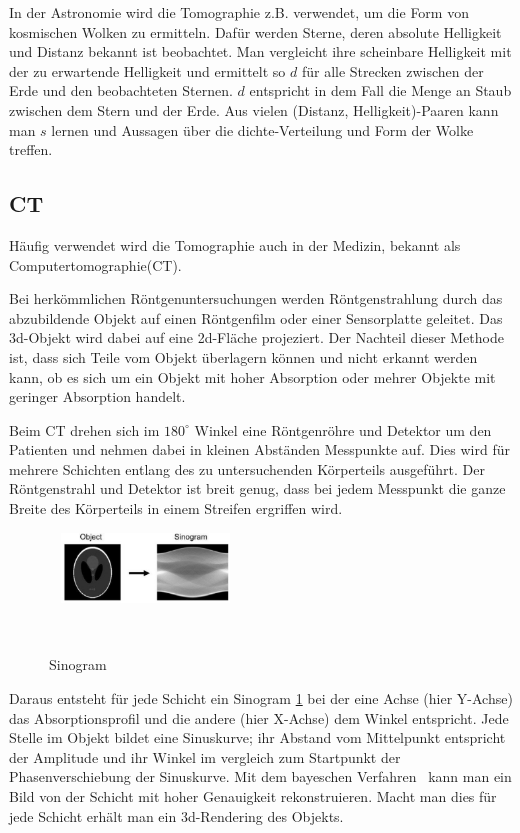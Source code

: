 \documentclass[]{dsadokumentation}
\begin{document}
In der Astronomie wird die Tomographie z.B. verwendet, um die Form von kosmischen Wolken zu ermitteln. Dafür werden Sterne, deren absolute Helligkeit und Distanz bekannt ist beobachtet. Man vergleicht ihre scheinbare Helligkeit mit der zu erwartende Helligkeit und ermittelt so $d$ für alle Strecken zwischen der Erde und den beobachteten Sternen. $d$ entspricht in dem Fall die Menge an Staub zwischen dem Stern und der Erde. Aus vielen (Distanz, Helligkeit)-Paaren kann man $s$ lernen und Aussagen über die dichte-Verteilung und Form der Wolke treffen.

\subsection{CT}

Häufig verwendet wird die Tomographie auch in der Medizin, bekannt als Computertomographie(CT).

Bei herkömmlichen Röntgenuntersuchungen werden Röntgenstrahlung durch das abzubildende Objekt auf einen Röntgenfilm oder einer Sensorplatte geleitet. Das 3d-Objekt wird dabei auf eine 2d-Fläche projeziert. Der Nachteil dieser Methode ist, dass sich Teile vom Objekt überlagern können und nicht erkannt werden kann, ob es sich um ein Objekt mit hoher Absorption oder mehrer Objekte mit geringer Absorption handelt.

Beim CT drehen sich im $180^\circ$ Winkel eine Röntgenröhre und Detektor um den Patienten und nehmen dabei in kleinen Abständen Messpunkte auf. Dies wird für mehrere Schichten entlang des zu untersuchenden Körperteils ausgeführt. Der Röntgenstrahl und Detektor ist breit genug, dass bei jedem Messpunkt die ganze Breite des Körperteils in einem Streifen ergriffen wird.

\begin{figure}
  \includegraphics[width=0.4\textwidth]{k4.2/backprojektion.png}
  \caption{Sinogram}
  \label{k4.2.tomo.ct.bp}
\end{figure}

Daraus entsteht für jede Schicht ein Sinogram \cref{k4.2.tomo.ct.bp} bei der eine Achse (hier Y-Achse) das Absorptionsprofil und die andere (hier X-Achse) dem Winkel entspricht. Jede Stelle im Objekt bildet eine Sinuskurve; ihr Abstand vom Mittelpunkt entspricht der Amplitude und ihr Winkel im vergleich zum Startpunkt der Phasenverschiebung der Sinuskurve. Mit dem bayeschen Verfahren  kann man ein Bild von der Schicht mit hoher Genauigkeit rekonstruieren. Macht man dies für jede Schicht erhält man ein 3d-Rendering des Objekts.
\end{document}
